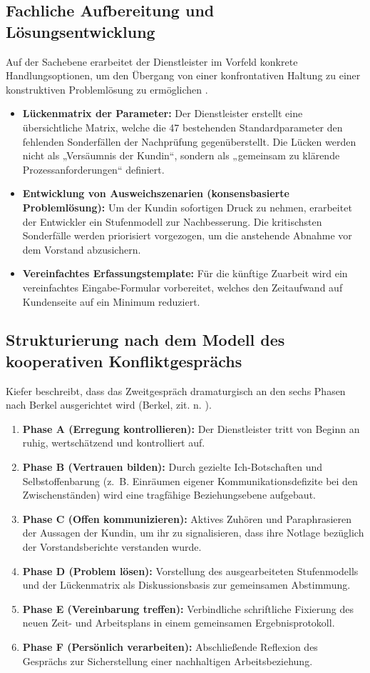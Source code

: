 \subsection{Fachliche Aufbereitung und Lösungsentwicklung}
Auf der Sachebene erarbeitet der Dienstleister im Vorfeld konkrete Handlungsoptionen, um den Übergang von einer konfrontativen Haltung zu einer konstruktiven Problemlösung zu ermöglichen \cite[S.~62]{5}.
\begin{itemize}
    \item \textbf{Lückenmatrix der Parameter:} Der Dienstleister erstellt eine übersichtliche Matrix, welche die 47 bestehenden Standardparameter den fehlenden Sonderfällen der Nachprüfung gegenüberstellt. Die Lücken werden nicht als „Versäumnis der Kundin“, sondern als „gemeinsam zu klärende Prozessanforderungen“ definiert.
    \item \textbf{Entwicklung von Ausweichszenarien (konsensbasierte Problemlösung):} Um der Kundin sofortigen Druck zu nehmen, erarbeitet der Entwickler ein Stufenmodell zur Nachbesserung. Die kritischsten Sonderfälle werden priorisiert vorgezogen, um die anstehende Abnahme vor dem Vorstand abzusichern.
    \item \textbf{Vereinfachtes Erfassungstemplate:} Für die künftige Zuarbeit wird ein vereinfachtes Eingabe-Formular vorbereitet, welches den Zeitaufwand auf Kundenseite auf ein Minimum reduziert.
\end{itemize}

\subsection{Strukturierung nach dem Modell des kooperativen Konfliktgesprächs}
Kiefer beschreibt, dass das Zweitgespräch dramaturgisch an den sechs Phasen nach Berkel ausgerichtet wird (Berkel, zit. n. \cite[S.~49--52]{5}).
\begin{enumerate}
    \item \textbf{Phase A (Erregung kontrollieren):} Der Dienstleister tritt von Beginn an ruhig, wertschätzend und kontrolliert auf.
    \item \textbf{Phase B (Vertrauen bilden):} Durch gezielte Ich-Botschaften und Selbstoffenbarung (z.~B. Einräumen eigener Kommunikationsdefizite bei den Zwischenständen) wird eine tragfähige Beziehungsebene aufgebaut.
    \item \textbf{Phase C (Offen kommunizieren):} Aktives Zuhören und Paraphrasieren der Aussagen der Kundin, um ihr zu signalisieren, dass ihre Notlage bezüglich der Vorstandsberichte verstanden wurde.
    \item \textbf{Phase D (Problem lösen):} Vorstellung des ausgearbeiteten Stufenmodells und der Lückenmatrix als Diskussionsbasis zur gemeinsamen Abstimmung.
    \item \textbf{Phase E (Vereinbarung treffen):} Verbindliche schriftliche Fixierung des neuen Zeit- und Arbeitsplans in einem gemeinsamen Ergebnisprotokoll.
    \item \textbf{Phase F (Persönlich verarbeiten):} Abschließende Reflexion des Gesprächs zur Sicherstellung einer nachhaltigen Arbeitsbeziehung.
\end{enumerate}

